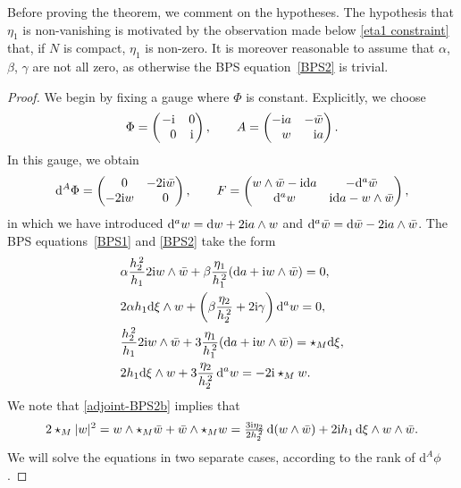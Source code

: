 \documentclass[10pt,a4paper]{amsart}
\newcommand{\1}{{\mathbb{1}}}
\def \d{\mathrm{d}}
\numberwithin{equation}{section}
\begin{document}
Before proving the theorem, we comment on the hypotheses. The hypothesis that $\eta_1$ is non-vanishing is motivated by the observation made below \eqref{eta1 constraint} that, if $N$ is compact, $\eta_1$ is non-zero. It is moreover reasonable to assume that $\alpha$, $\beta$, $\gamma$ are not all zero, as otherwise the BPS equation~\eqref{BPS2} is trivial.

\begin{proof} We begin by fixing a gauge where $\Phi$ is constant. Explicitly, we choose
\begin{equation}
\label{adjoint-Phi-A}
\Phi=\begin{pmatrix} -{\rm i} & 0 \\ \hphantom{-}0 & {\rm i} \end{pmatrix},\qquad
A = \begin{pmatrix} -{\rm i}a & -\bar{w} \\ \hphantom{-}w & \hphantom{-}{\rm i}a \end{pmatrix}.
\end{equation}
In this gauge, we obtain
\begin{equation}\label{adjoint-dPhi-F}
\d^A\Phi = \begin{pmatrix}\hphantom{-}0 & -2{\rm i}\bar{w} \\ -2{\rm i}w & \hphantom{-}0 \end{pmatrix}, \qquad
F = \begin{pmatrix} w \wedge \bar{w}-{\rm i}\d a & -\d^a\bar{w} \\ \d^a w& {\rm i}\d a - w\wedge\bar{w} \end{pmatrix},
\end{equation}
in which we have introduced $\d^a w = \d w + 2{\rm i}a\wedge w$ and $\d^a \bar{w} = \d \bar{w} - 2{\rm i}a\wedge \bar{w}$. The BPS equations~\eqref{BPS1} and \eqref{BPS2} take the form
\begin{align}
&\alpha \frac{h_2^{\,2}}{h_1}2{\rm i}w\wedge\bar{w} + \beta\frac{\eta_1}{h_1^{\,2}}(\d a+{\rm i}w\wedge\bar{w}) = 0, \label{adjoint-BPS1a}\\
&2\alpha h_1\d\xi\wedge w + \left(\beta\frac{\eta_2}{h_2^{\,2}}+2{\rm i}\gamma\right)\d^a w =0, \label{adjoint-BPS1b}\\
&\frac{h_2^{\,2}}{h_1}2{\rm i}w\wedge\bar{w} + 3\frac{\eta_1}{h_1^{\,2}}(\d a+{\rm i}w\wedge\bar{w}) = \star_{M}\d\xi,\nonumber \\ %
&2 h_1\d\xi\wedge w + 3\frac{\eta_2}{h_2^{\,2}}\,\d^a w =-2{\rm i}\star_{M}w.\label{adjoint-BPS2b}
\end{align}
We note that \eqref{adjoint-BPS2b} implies that{\samepage
\begin{equation}\label{adjoint-BPS3}
2\star_{M}|w|^2 = w\wedge\star_{M}\bar{w}+\bar{w}\wedge\star_{M}w = \tfrac{3{\rm i}\eta_2}{2h_2^{\,2}}\,\d(w \wedge\bar{w})+2{\rm i}h_1\,\d\xi\wedge w\wedge\bar{w}.
\end{equation}
We will solve the equations in two separate cases, according to the rank of $\d^A\phi$.}


\end{proof}
\end{document}
